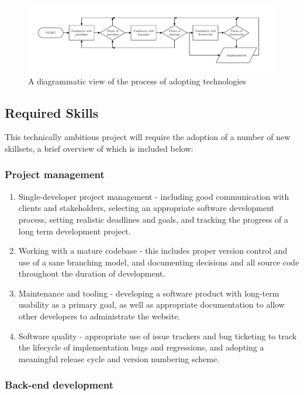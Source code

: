\begin{figure}[H]
\centering
\includegraphics[width=7.2in]{assets/flow-tech-choices.pdf}
\caption{A diagrammatic view of the process of adopting technologies}
\label{fig:flow-tech-choices}
\end{figure}

\newpage
\subsection{Required Skills}
This technically ambitious project will require the adoption of a number of new
skillsets, a brief overview of which is included below:

\subsubsection{Project management}

\begin{enumerate}
\item Single-developer project management - including good communication with
  clients and stakeholders, selecting an appropriate software development
  process, setting realistic deadlines and goals, and tracking the progress of a
  long term development project.
\item Working with a mature codebase - this includes proper version control and
  use of a sane branching model, and documenting decisions and all source code
  throughout the duration of development.
\item Maintenance and tooling - developing a software product with long-term
  usability as a primary goal, as well as appropriate documentation to allow
  other developers to administrate the website.
\item Software quality - appropriate use of issue trackers and bug ticketing to
  track the lifecycle of implementation bugs and regressions, and adopting a
  meaningful release cycle and version numbering scheme.
\end{enumerate}

\subsubsection{Back-end development}

